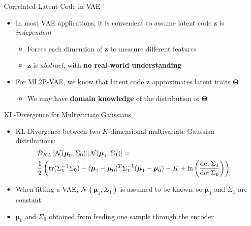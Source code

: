 \documentclass{beamer}
\def \tr{\ensuremath \text{tr}}
\newcommand{\vect}[1]{\boldsymbol{#1}}
\theoremstyle{definition}
\begin{document}
\begin{frame}{Correlated Latent Code in VAE}
\begin{itemize}
  \item In most VAE applications, it is convenient to assume latent code $\vect z$ is \textit{independent}
    \begin{itemize}
      \item Forces each dimension of $\vect z$ to measure different features
      \item $\vect z$ is \textit{abstract}, with \textbf{no real-world understanding}
    \end{itemize}
  \item<2-> For ML2P-VAE, we know that latent code $\vect z$ approximates latent traits $\vect \Theta$
    \begin{itemize}
      \item<2-> We may have \textbf{domain knowledge} of the distribution of $\vect \Theta$
    \end{itemize}
\end{itemize}
\end{frame}

\begin{frame}{KL-Divergence for Multivariate Gaussians}
\begin{itemize}
  \item KL-Divergence between two $K$-dimensional multivariate Gaussian distributions:
\begin{align*}
&\mathcal{D}_{KL}\left[\mathcal{N}(\vect\mu_0, \Sigma_0) || \mathcal{N}(\vect\mu_1, \Sigma_1)\right] = \\
&\frac{1}{2} \left(\tr(\Sigma_1^{-1} \Sigma_0) + (\vect\mu_1 - \vect\mu_0)^T \Sigma_1^{-1} (\vect\mu_1 - \vect\mu_0) - K + \ln\left(\frac{\det \Sigma_1}{\det \Sigma_0} \right) \right)
\end{align*}
  \item<2-> When fitting a VAE, $\mathcal{N}(\vect\mu_1, \Sigma_1)$ is assumed to be known, so $\vect\mu_1$ and $\Sigma_1$ are constant
  \item<2-> $\vect\mu_0$ and $\Sigma_0$ obtained from feeding one sample through the encoder
\end{itemize}
\end{frame}

\end{document}
